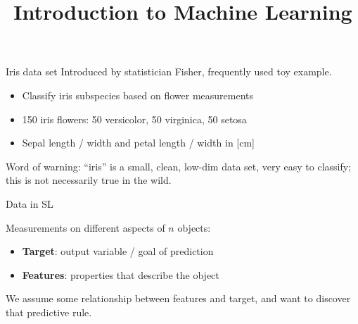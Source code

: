 \documentclass[11pt,compress,t,notes=noshow, xcolor=table]{beamer}
\title{Introduction to Machine Learning}
\begin{document}


\begin{frame2}{Iris data set}
Introduced by statistician Fisher, frequently used toy example.
\begin{itemize}
\item Classify iris subspecies based on flower measurements
\item 150 iris flowers: 50 versicolor, 50 virginica, 50 setosa
\item Sepal length / width and petal length / width in [cm]
\end{itemize}
Word of warning: ``iris'' is a small, clean, low-dim data set, very easy to classify; this is not necessarily true in the wild. 
\end{frame2}


\begin{framei}{Data in SL}
\item Measurements on different aspects of $n$ objects:
\begin{itemize}
  \item \textbf{Target}: output variable / goal of prediction
  \item \textbf{Features}: properties that describe the object
\end{itemize}
\item We assume some relationship between features and target, and want to discover that predictive rule.
\vfill
{}
{
}
\end{framei}
\end{document}
